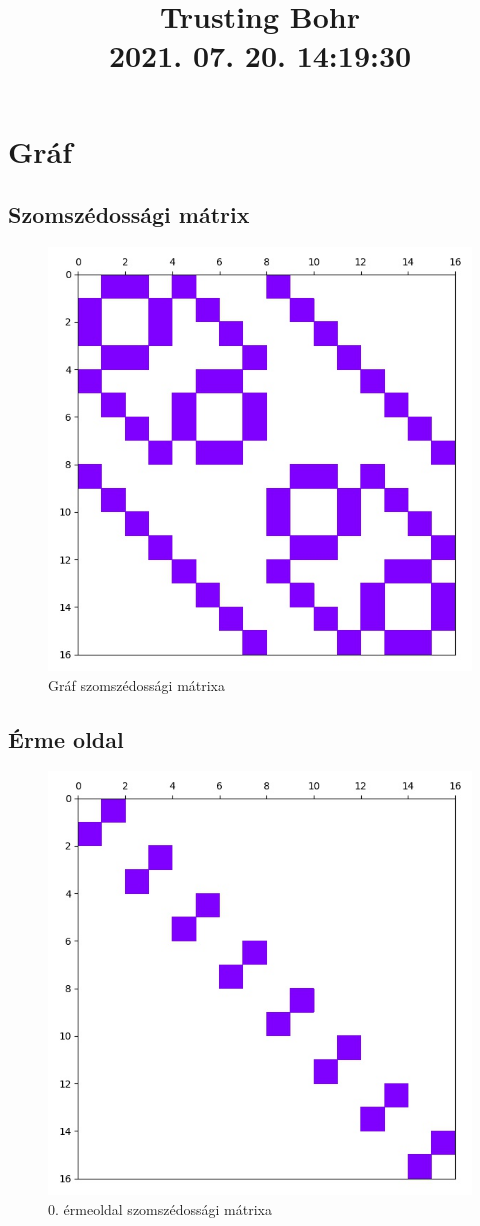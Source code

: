 \documentclass[14pt,a4paper]{article}
\title{Trusting Bohr \\ \large 2021. 07. 20. 14:19:30}
\author{}
\date{}
\begin{document}
\maketitle
\section{Gráf}
\subsection{Szomszédossági mátrix}
\begin{figure}[H]
\centering
\includegraphics[width = 0.7\columnwidth]{graph/graph.jpg}
\caption{Gráf szomszédossági mátrixa}
\end{figure}
\subsection{Érme oldal}
\begin{figure}[H]
\centering
\includegraphics[width = 0.7\columnwidth]{coin_faces/coin_face_00.jpg}
\caption{0. érmeoldal szomszédossági mátrixa}
\end{figure}
\end{document}
